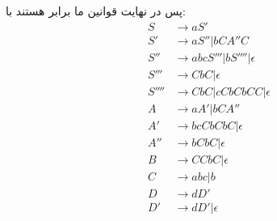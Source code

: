 \documentclass[]{article}
\begin{document}
پس در نهایت قوانین ما برابر هستند با:
\begin{align*}
    S &\rightarrow aS'\\
    S' &\rightarrow aS'' | bCA''C\\
    S'' &\rightarrow abcS''' | bS'''' | \epsilon\\
    S''' &\rightarrow CbC | \epsilon\\
    S'''' &\rightarrow CbC | cCbCbCC | \epsilon\\
    A  &\rightarrow aA' | bCA''\\
    A' &\rightarrow bcCbCbC | \epsilon\\
    A'' &\rightarrow bCbC | \epsilon\\
    B &\rightarrow CCbC | \epsilon\\
    C &\rightarrow abc | b\\
    D &\rightarrow dD'\\
    D' &\rightarrow dD' | \epsilon
\end{align*}
\end{document}
